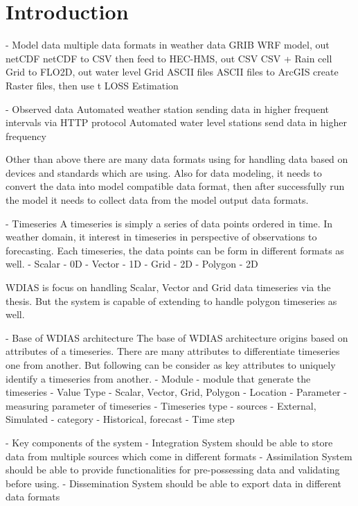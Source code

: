 \section{Introduction}


- Model data
multiple data formats in weather data
GRIB WRF model, out netCDF
netCDF to CSV then feed to HEC-HMS, out CSV
CSV + Rain cell Grid to FLO2D, out water level Grid ASCII files
ASCII files to ArcGIS create Raster files, then use t LOSS Estimation

- Observed data
Automated weather station sending data in higher frequent intervals via HTTP protocol
Automated water level stations send data in higher frequency

Other than above there are many data formats using for handling data based on devices and standards which are using. Also for data modeling, it needs to convert the data into model compatible data format, then after successfully run the model it needs to collect data from the model output data formats.

- Timeseries
A timeseries is simply a series of data points ordered in time. In weather domain, it interest in timeseries in perspective of observations to forecasting.
Each timeseries, the data points can be form in different formats as well.
- Scalar - 0D
- Vector - 1D
- Grid - 2D
- Polygon - 2D

WDIAS is focus on handling Scalar, Vector and Grid data timeseries via the thesis. But the system is capable of extending to handle polygon timeseries as well.

- Base of WDIAS architecture
The base of WDIAS architecture origins based on attributes of a timeseries. There are many attributes to differentiate timeseries one from another. But following can be consider as key attributes to uniquely identify a timeseries from another.
- Module - module that generate the timeseries
- Value Type - Scalar, Vector, Grid, Polygon
- Location 
- Parameter - measuring parameter of timeseries
- Timeseries type
  - sources - External, Simulated
  - category - Historical, forecast
- Time step

- Key components of the system
- Integration
System should be able to store data from multiple sources which come in different formats
- Assimilation
System should be able to provide functionalities for pre-possessing data and validating before using. 
- Dissemination
System should be able to export data in different data formats